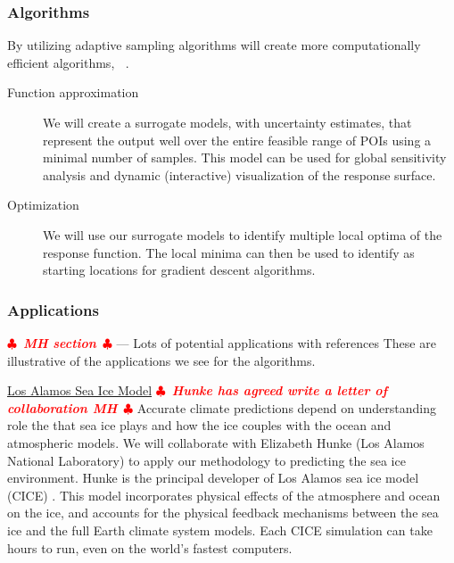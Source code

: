 \documentclass[11pt]{NSFamsart}
\DeclareMathOperator{\QOI}{QOI}
\DeclareMathOperator{\APP}{\widehat{\QOI}}
\newif\ifnotesw \noteswtrue
\newcommand{\notes}[1]{\ifnotesw \textcolor{red}{  $\clubsuit$\ {\sf \bf \it  #1}\ $\clubsuit$  }\fi}
\begin{document}
\subsubsection{Algorithms}
By utilizing adaptive sampling algorithms will create more computationally efficient algorithms, $\APP$.
\renewcommand{\descriptionlabel}[1]{\hspace{\labelsep}\textit{#1}.}
\begin{description}
\item[Function approximation] We will create a surrogate models, with uncertainty estimates, that represent the output well over the entire feasible range of POIs using a minimal number of samples.  This model can be used for global sensitivity analysis and dynamic (interactive) visualization of the response surface. 
\item[Optimization] We will use our surrogate models to identify multiple local optima of the response function.  The local minima can then be used to identify as starting locations for gradient descent algorithms.
\end{description}

\subsubsection{Applications} \notes{MH section}
--- Lots of potential applications with references 
These are illustrative of the applications we see for the algorithms. 


\underline{Los Alamos Sea Ice Model}  \notes{Hunke has agreed write a letter of collaboration MH}
Accurate climate predictions depend on understanding role the that sea ice plays and how the ice couples with the ocean and atmospheric models.
We will collaborate with Elizabeth Hunke (Los Alamos National Laboratory) to apply our methodology to predicting the sea ice environment.   Hunke is the principal developer of  Los Alamos sea ice model (CICE) \cite{hunke2017cice, hunke2010cice}. This model incorporates physical effects of the atmosphere and ocean on the ice, and accounts for the physical feedback mechanisms between the sea ice and the full Earth climate system models. Each CICE simulation can take hours to run, even on the world's fastest computers.
\end{document}
